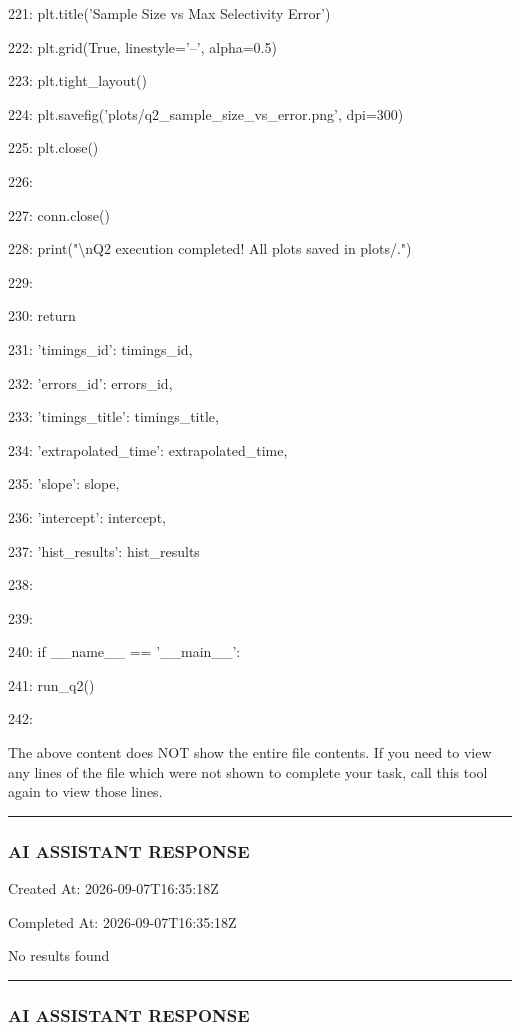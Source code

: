 \documentclass[11pt,a4paper]{article}
\begin{document}
221:     plt.title('Sample Size vs Max Selectivity Error')

222:     plt.grid(True, linestyle='--', alpha=0.5)

223:     plt.tight\_layout()

224:     plt.savefig('plots/q2\_sample\_size\_vs\_error.png', dpi=300)

225:     plt.close()

226:

227:     conn.close()

228:     print("\textbackslash{}nQ2 execution completed! All plots saved in plots/.")

229:

230:     return {

231:         'timings\_id': timings\_id,

232:         'errors\_id': errors\_id,

233:         'timings\_title': timings\_title,

234:         'extrapolated\_time': extrapolated\_time,

235:         'slope': slope,

236:         'intercept': intercept,

237:         'hist\_results': hist\_results

238:     }

239:

240: if \_\_name\_\_ == '\_\_main\_\_':

241:     run\_q2()

242:

The above content does NOT show the entire file contents. If you need to view any lines of the file which were not shown to complete your task, call this tool again to view those lines.


\hrule

\subsubsection{AI ASSISTANT RESPONSE}

Created At: 2026-09-07T16:35:18Z

Completed At: 2026-09-07T16:35:18Z

No results found


\hrule

\subsubsection{AI ASSISTANT RESPONSE}
\end{document}
